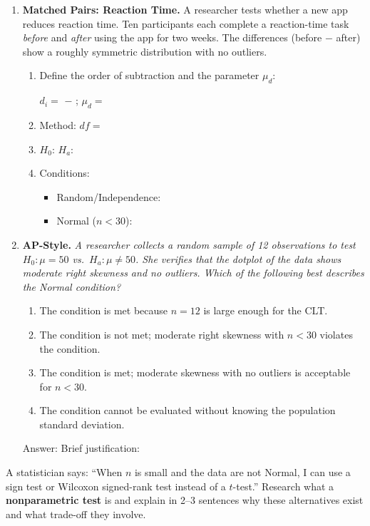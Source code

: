\documentclass[10pt]{article}
\begin{document}
\begin{enumerate}
\item \textbf{Matched Pairs: Reaction Time.} \quad
A researcher tests whether a new app reduces reaction time. Ten participants each complete
a reaction-time task \emph{before} and \emph{after} using the app for two weeks. The
differences (before $-$ after) show a roughly symmetric distribution with no outliers.

\begin{enumerate}[label=\alph*.]
  \item Define the order of subtraction and the parameter $\mu_d$:

        $d_i = $ \blank{3cm} $-$ \blank{3cm} \quad; \quad $\mu_d = $ \blank{6cm}

  \item Method: \blank{5cm} \quad $df = $ \blank{1.5cm}
  \item $H_0$: \blank{4cm} \quad $H_a$: \blank{4cm}
  \item Conditions:
        \begin{itemize}
          \item Random/Independence: \writeline
          \item Normal ($n < 30$): \writeline
        \end{itemize}
\end{enumerate}
\vspace{0.1in}

\item \textbf{AP-Style.} \quad
\textit{A researcher collects a random sample of 12 observations to test $H_0: \mu = 50$ vs.\
$H_a: \mu \ne 50$. She verifies that the dotplot of the data shows moderate right skewness and
no outliers. Which of the following best describes the Normal condition?}

\begin{enumerate}[label=(\Alph*)]
  \item The condition is met because $n = 12$ is large enough for the CLT.
  \item The condition is not met; moderate right skewness with $n < 30$ violates the condition.
  \item The condition is met; moderate skewness with no outliers is acceptable for $n < 30$.
  \item The condition cannot be evaluated without knowing the population standard deviation.
\end{enumerate}
\vspace{0.06in}
Answer: \blank{1.5cm} \quad Brief justification: \writeline

\end{enumerate}

\begin{extensionbox}
A statistician says: ``When $n$ is small and the data are not Normal, I can use a sign test or
Wilcoxon signed-rank test instead of a $t$-test.'' Research what a \textbf{nonparametric test}
is and explain in 2--3 sentences why these alternatives exist and what trade-off they involve.
\writelines{3}
\end{extensionbox}
\end{document}
